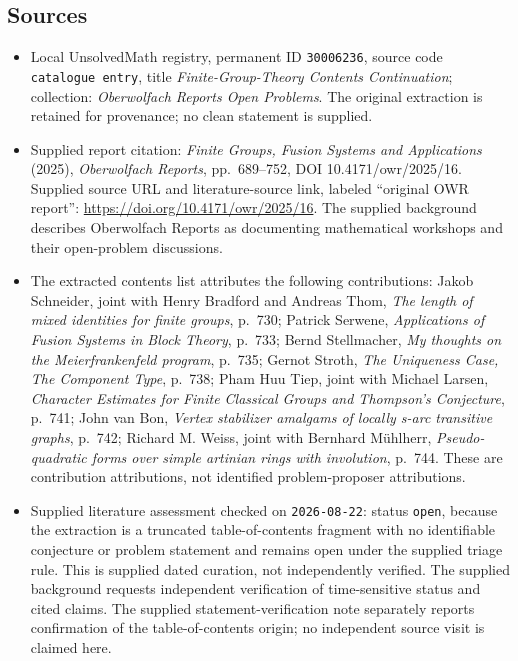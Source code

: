 \documentclass[11pt]{article}
\begin{document}
\subsection{Sources}
\begin{itemize}
\item Local UnsolvedMath registry, permanent ID \texttt{30006236}, source code \texttt{catalogue entry}, title \emph{Finite-Group-Theory Contents Continuation}; collection: \emph{Oberwolfach Reports Open Problems}. The original extraction is retained for provenance; no clean statement is supplied.
\item Supplied report citation: \emph{Finite Groups, Fusion Systems and Applications} (2025), \emph{Oberwolfach Reports}, pp.\ 689--752, DOI 10.4171/owr/2025/16. Supplied source URL and literature-source link, labeled ``original OWR report'': \url{https://doi.org/10.4171/owr/2025/16}. The supplied background describes Oberwolfach Reports as documenting mathematical workshops and their open-problem discussions.
\item The extracted contents list attributes the following contributions: Jakob Schneider, joint with Henry Bradford and Andreas Thom, \emph{The length of mixed identities for finite groups}, p.\ 730; Patrick Serwene, \emph{Applications of Fusion Systems in Block Theory}, p.\ 733; Bernd Stellmacher, \emph{My thoughts on the Meierfrankenfeld program}, p.\ 735; Gernot Stroth, \emph{The Uniqueness Case, The Component Type}, p.\ 738; Pham Huu Tiep, joint with Michael Larsen, \emph{Character Estimates for Finite Classical Groups and Thompson's Conjecture}, p.\ 741; John van Bon, \emph{Vertex stabilizer amalgams of locally s-arc transitive graphs}, p.\ 742; Richard M. Weiss, joint with Bernhard M\"{u}hlherr, \emph{Pseudo-quadratic forms over simple artinian rings with involution}, p.\ 744. These are contribution attributions, not identified problem-proposer attributions.
\item Supplied literature assessment checked on \texttt{2026-08-22}: status \texttt{open}, because the extraction is a truncated table-of-contents fragment with no identifiable conjecture or problem statement and remains open under the supplied triage rule. This is supplied dated curation, not independently verified. The supplied background requests independent verification of time-sensitive status and cited claims. The supplied statement-verification note separately reports confirmation of the table-of-contents origin; no independent source visit is claimed here.
\end{itemize}
\end{document}
